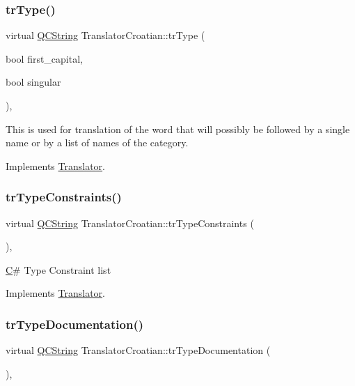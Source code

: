 \subsubsection{\texorpdfstring{trType()}{trType()}}
{\footnotesize\ttfamily virtual \mbox{\hyperlink{class_q_c_string}{Q\+C\+String}} Translator\+Croatian\+::tr\+Type (\begin{DoxyParamCaption}\item[{bool}]{first\+\_\+capital,  }\item[{bool}]{singular }\end{DoxyParamCaption})\hspace{0.3cm}{\ttfamily [inline]}, {\ttfamily [virtual]}}

This is used for translation of the word that will possibly be followed by a single name or by a list of names of the category. 

Implements \mbox{\hyperlink{class_translator}{Translator}}.

\mbox{\label{class_translator_croatian_af81d5be2e3456c26a74b2680e37a51b0}} 
\subsubsection{\texorpdfstring{trTypeConstraints()}{trTypeConstraints()}}
{\footnotesize\ttfamily virtual \mbox{\hyperlink{class_q_c_string}{Q\+C\+String}} Translator\+Croatian\+::tr\+Type\+Constraints (\begin{DoxyParamCaption}{ }\end{DoxyParamCaption})\hspace{0.3cm}{\ttfamily [inline]}, {\ttfamily [virtual]}}

\mbox{\hyperlink{class_c}{C}}\# Type Constraint list 

Implements \mbox{\hyperlink{class_translator}{Translator}}.

\mbox{\label{class_translator_croatian_a00d80d36c26b46e2c01cba0e9c07d189}} 
\subsubsection{\texorpdfstring{trTypeDocumentation()}{trTypeDocumentation()}}
{\footnotesize\ttfamily virtual \mbox{\hyperlink{class_q_c_string}{Q\+C\+String}} Translator\+Croatian\+::tr\+Type\+Documentation (\begin{DoxyParamCaption}{ }\end{DoxyParamCaption})\hspace{0.3cm}{\ttfamily [inline]}, {\ttfamily [virtual]}}

